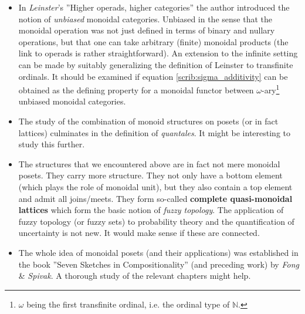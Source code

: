    \begin{itemize}
        \item In \textit{Leinster}'s ''Higher operads, higher categories'' the author introduced the notion of \textit{unbiased} monoidal categories. Unbiased in the sense that the monoidal operation was not just defined in terms of binary and nullary operations, but that one can take arbitrary (finite) monoidal products (the link to operads is rather straightforward). An extension to the infinite setting can be made by suitably generalizing the definition of Leinster to transfinite ordinals. It should be examined if equation \ref{scrib:sigma_additivity} can be obtained as the defining property for a monoidal functor between $\omega$-ary\footnote{$\omega$ being the first transfinite ordinal, i.e. the ordinal type of $\mathbb{N}$.} unbiased monoidal categories.
        \item The study of the combination of monoid structures on posets (or in fact lattices) culminates in the definition of \textit{quantales}. It might be interesting to study this further.
        \item The structures that we encountered above are in fact not mere monoidal posets. They carry more structure. They not only have a bottom element (which plays the role of monoidal unit), but they also contain a top element and admit all joins/meets. They form so-called \textbf{complete quasi-monoidal lattices} which form the basic notion of \textit{fuzzy topology}. The application of fuzzy topology (or fuzzy sets) to probability theory and the quantification of uncertainty is not new. It would make sense if these are connected.
        \item The whole idea of monoidal posets (and their applications) was established in the book ''Seven Sketches in Compositionality'' (and preceding work) by \textit{Fong} \& \textit{Spivak}. A thorough study of the relevant chapters might help.
    \end{itemize}
